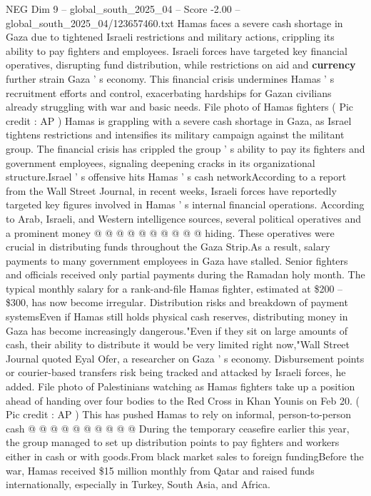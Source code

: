 \begin{textsample}{NEG Dim 9 – global\_south\_2025\_04 – Score -2.00 – global\_south\_2025\_04/123657460.txt}  \label{ex:f9_neg_273}
Hamas faces a severe cash shortage in Gaza due to tightened Israeli restrictions and military actions, crippling its ability to pay fighters and employees.
Israeli forces have targeted key financial operatives, disrupting fund distribution, while restrictions on aid and \textbf{currency} further strain Gaza ' s economy.
This financial crisis undermines Hamas ' s recruitment efforts and control, exacerbating hardships for Gazan civilians already struggling with war and basic needs.
File photo of Hamas fighters ( Pic credit : AP ) Hamas is grappling with a severe cash shortage in Gaza, as Israel tightens restrictions and intensifies its military campaign against the militant group.
The financial crisis has crippled the group ' s ability to pay its fighters and government employees, signaling deepening cracks in its organizational structure.Israel ' s offensive hits Hamas ' s cash networkAccording to a report from the Wall Street Journal, in recent weeks, Israeli forces have reportedly targeted key figures involved in Hamas ' s internal financial operations.
According to Arab, Israeli, and Western intelligence sources, several political operatives and a prominent money @ @ @ @ @ @ @ @ @ @ hiding.
These operatives were crucial in distributing funds throughout the Gaza Strip.As a result, salary payments to many government employees in Gaza have stalled.
Senior fighters and officials received only partial payments during the Ramadan holy month.
The typical monthly salary for a rank-and-file Hamas fighter, estimated at \$200 -- \$300, has now become irregular.
Distribution risks and breakdown of payment systemsEven if Hamas still holds physical cash reserves, distributing money in Gaza has become increasingly dangerous."Even if they sit on large amounts of cash, their ability to distribute it would be very limited right now,"Wall Street Journal quoted Eyal Ofer, a researcher on Gaza ' s economy.
Disbursement points or courier-based transfers risk being tracked and attacked by Israeli forces, he added.
File photo of Palestinians watching as Hamas fighters take up a position ahead of handing over four bodies to the Red Cross in Khan Younis on Feb 20. ( Pic credit : AP ) This has pushed Hamas to rely on informal, person-to-person cash @ @ @ @ @ @ @ @ @ @ During the temporary ceasefire earlier this year, the group managed to set up distribution points to pay fighters and workers either in cash or with goods.From black market sales to foreign fundingBefore the war, Hamas received \$15 million monthly from Qatar and raised funds internationally, especially in Turkey, South Asia, and Africa.

\end{textsample}
